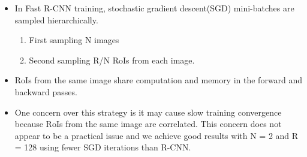 \documentclass[11pt]{article}
\begin{document}
\begin{itemize}
\item In Fast R-CNN training, stochastic gradient descent(SGD) mini-batches are sampled 
      hierarchically.
\begin{enumerate}
\item First sampling N images
\item Second sampling R/N RoIs from each image.
\end{enumerate}
\item RoIs from the same image share computation and memory in the forward and backward
      passes.
\item One concern over this strategy is it may cause slow training convergence because
      RoIs from the same image are correlated. This concern does not appear to be a 
      practical issue and we achieve good results with N = 2 and R = 128 using fewer
      SGD iterations than R-CNN.
\end{itemize}
\end{document}
